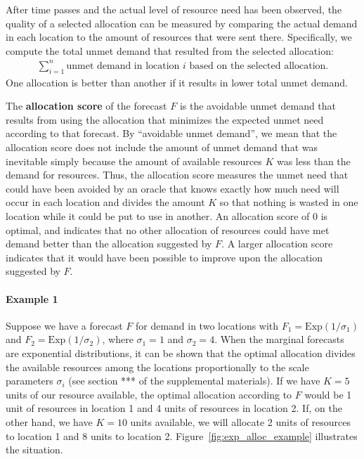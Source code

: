 \documentclass{article}
\begin{document}
After time passes and the actual level of resource need has been observed, the quality of a selected allocation can be measured by comparing the actual demand in each location to the amount of resources that were sent there. Specifically, we compute the total unmet demand that resulted from the selected allocation:
\begin{align}
    \sum_{i=1}^n \text{unmet demand in location $i$ based on the selected allocation}.
\end{align}
One allocation is better than another if it results in lower total unmet demand.

The \textbf{allocation score} of the forecast $F$ is the avoidable unmet demand that results from using the allocation that minimizes the expected unmet need according to that forecast.
By ``avoidable unmet demand'', we mean that the allocation score does not include the amount of unmet demand that was inevitable simply because the amount of available resources $K$ was less than the demand for resources.
Thus, the allocation score measures the unmet need that could have been avoided by an oracle that knows exactly how much need will occur in each location and divides the amount $K$ so that nothing is wasted in one location while it could be put to use in another. An allocation score of 0 is optimal, and indicates that no other allocation of resources could have met demand better than the allocation suggested by $F$. A larger allocation score indicates that it would have been possible to improve upon the allocation suggested by $F$.

\paragraph{Example 1} Suppose we have a forecast $F$ for demand in two locations with $F_1 = \mathrm{Exp}(1 / \sigma_1)$ and $F_2 = \mathrm{Exp}(1 / \sigma_2)$, where $\sigma_1 = 1$ and $\sigma_2 = 4$. When the marginal forecasts are exponential distributions, it can be shown that the optimal allocation divides the available resources among the locations proportionally to the scale parameters $\sigma_i$ (see section *** of the supplemental materials). If we have $K = 5$ units of our resource available, the optimal allocation according to $F$ would be 1 unit of resources in location 1 and 4 units of resources in location 2. If, on the other hand, we have $K = 10$ units available, we will allocate 2 units of resources to location 1 and 8 units to location 2. Figure~\ref{fig:exp_alloc_example} illustrates the situation.
\end{document}
